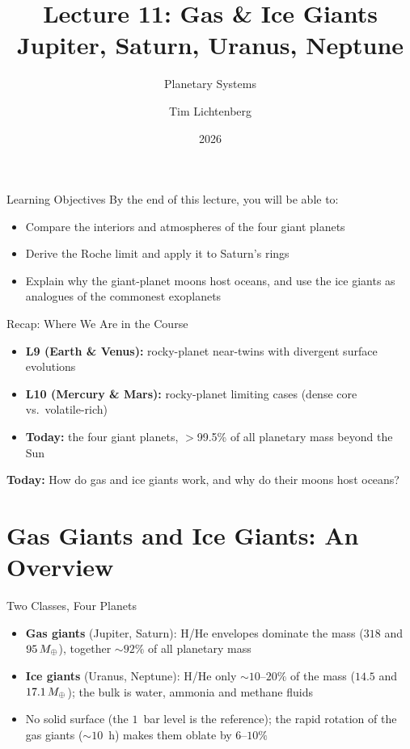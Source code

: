 \documentclass[aspectratio=169, 11pt]{beamer}
\title[Lecture 11: Giants]{Lecture 11: Gas \& Ice Giants\\Jupiter, Saturn, Uranus, Neptune}
\subtitle{Planetary Systems}
\author[L11]{Tim Lichtenberg}
\institute{Kapteyn Astronomical Institute\\University of Groningen}
\date{2026}
\begin{document}
\begin{frame}
  \titlepage
\end{frame}

\begin{frame}{Learning Objectives}
  By the end of this lecture, you will be able to:
  \vskip8pt
  \begin{itemize}
    \item Compare the interiors and atmospheres of the four giant planets
    \item Derive the Roche limit and apply it to Saturn's rings
    \item Explain why the giant-planet moons host oceans, and use the ice giants as analogues of the commonest exoplanets
  \end{itemize}
\end{frame}

\begin{frame}{Recap: Where We Are in the Course}
  \begin{itemize}
    \item \textbf{L9 (Earth \& Venus):} rocky-planet near-twins with divergent surface evolutions
    \item \textbf{L10 (Mercury \& Mars):} rocky-planet limiting cases (dense core vs.\ volatile-rich)
    \item \textbf{Today:} the four giant planets, $>$99.5\% of all planetary mass beyond the Sun
  \end{itemize}
  \vskip8pt
  \textbf{Today:} How do gas and ice giants work, and why do their moons host oceans?
\end{frame}


\section{Gas Giants and Ice Giants: An Overview}


\begin{frame}{Two Classes, Four Planets}
  \begin{itemize}\setlength\itemsep{4pt}
    \item \textbf{Gas giants} (Jupiter, Saturn): H/He envelopes dominate the mass ($318$ and $95\,M_{\oplus}$), together $\sim 92\%$ of all planetary mass
    \item \textbf{Ice giants} (Uranus, Neptune): H/He only $\sim 10$--$20\%$ of the mass ($14.5$ and $17.1\,M_{\oplus}$); the bulk is water, ammonia and methane fluids
    \item No solid surface (the $1$~bar level is the reference); the rapid rotation of the gas giants ($\sim 10$~h) makes them oblate by $6$--$10\%$
  \end{itemize}
\end{frame}
\end{document}
